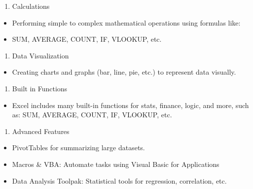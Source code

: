 \documentclass[
]{article}
\providecommand{\tightlist}{%
  \setlength{\itemsep}{0pt}\setlength{\parskip}{0pt}}
\begin{document}
\begin{enumerate}
\def\labelenumi{\arabic{enumi}.}
\setcounter{enumi}{1}
\tightlist
\item
  Calculations
\end{enumerate}

\begin{itemize}
\tightlist
\item
  Performing simple to complex mathematical operations using formulas
  like:
\item
  SUM, AVERAGE, COUNT, IF, VLOOKUP, etc.
\end{itemize}

\begin{enumerate}
\def\labelenumi{\arabic{enumi}.}
\setcounter{enumi}{2}
\tightlist
\item
  Data Visualization
\end{enumerate}

\begin{itemize}
\tightlist
\item
  Creating charts and graphs (bar, line, pie, etc.) to represent data
  visually.
\end{itemize}

\begin{enumerate}
\def\labelenumi{\arabic{enumi}.}
\setcounter{enumi}{3}
\tightlist
\item
  Built in Functions
\end{enumerate}

\begin{itemize}
\tightlist
\item
  Excel includes many built-in functions for stats, finance, logic, and
  more, such as: SUM, AVERAGE, COUNT, IF, VLOOKUP, etc.
\end{itemize}

\begin{enumerate}
\def\labelenumi{\arabic{enumi}.}
\setcounter{enumi}{4}
\tightlist
\item
  Advanced Features
\end{enumerate}

\begin{itemize}
\tightlist
\item
  PivotTables for summarizing large datasets.
\item
  Macros \& VBA: Automate tasks using Visual Basic for Applications
\item
  Data Analysis Toolpak: Statistical tools for regression, correlation,
  etc.
\end{itemize}
\end{document}
